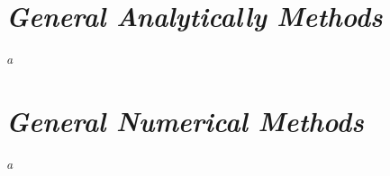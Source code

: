

\section{\textit{General Analytically Methods}}

	\textit{a}

\section{\textit{General Numerical Methods}}

	\textit{a}


